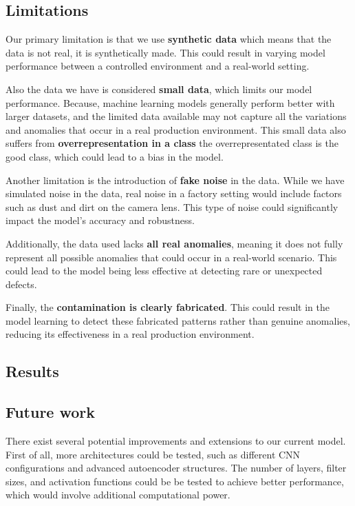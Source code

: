 \subsection{Limitations}

Our primary limitation is that we use \textbf{synthetic data} which means that the data is not real, it is synthetically made.
This could result in varying model performance between a controlled environment and a real-world setting.

Also the data we have is considered \textbf{small data}, which limits our model performance. 
Because, machine learning models generally perform better with larger datasets, and the limited data available may not capture all the variations and anomalies that occur in a real production environment.
This small data also suffers from \textbf{overrepresentation in a class} the overrepresentated class is the good class, which could lead to a bias in the model. 

Another limitation is the introduction of \textbf{fake noise} in the data.
While we have simulated noise in the data, real noise in a factory setting would include factors such as dust and dirt on the camera lens. 
This type of noise could significantly impact the model's accuracy and robustness.

Additionally, the data used lacks \textbf{all real anomalies}, meaning it does not fully represent all possible anomalies that could occur in a real-world scenario. 
This could lead to the model being less effective at detecting rare or unexpected defects.

Finally, the \textbf{contamination is clearly fabricated}.
This could result in the model learning to detect these fabricated patterns rather than genuine anomalies, reducing its effectiveness in a real production environment.

\subsection{Results}

\subsection{Future work}
There exist several potential improvements and extensions to our current model. 
First of all, more architectures could be tested, such as different CNN configurations and advanced autoencoder structures. 
The number of layers, filter sizes, and activation functions could be be tested to achieve better performance, which would involve additional computational power.

